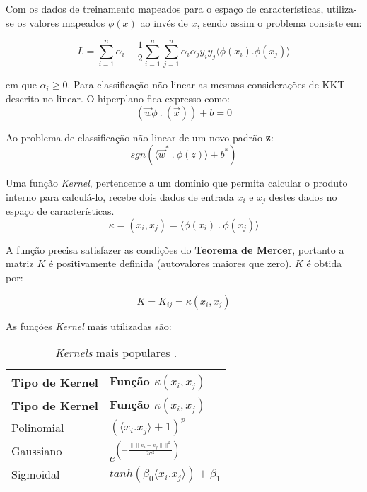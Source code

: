 \documentclass[
]{book}
\begin{document}
Com os dados de treinamento mapeados para o espaço de características, utiliza-se os valores mapeados \(\phi(x)\) ao invés de \(x\), sendo assim o problema consiste em:

\begin{equation} 
L =\displaystyle \sum^n_{i=1}\alpha_i-\frac{1}{2} \displaystyle \sum^n_{i=1}\sum^n_{j=1}\alpha_i\alpha_j y_i y_j \langle \phi(x_i).\phi(x_j)\rangle
\label{eq:svnphi}
\end{equation}

em que \(\alpha_i \geq 0\). Para classificação não-linear as mesmas considerações de KKT descrito no linear. O hiperplano fica expresso como:
\begin{equation}
(\vec{w}\phi \ . \ (\vec{x}))+b=0
\label{eq:hipotimophi}
\end{equation}

Ao problema de classificação não-linear de um novo padrão \textbf{z}:
\begin{equation}
sgn(\langle \vec{w}^* \ . \ \phi(z)\rangle+b^*)
\label{eq:naolinzphi}
\end{equation}

Uma função \emph{Kernel}, pertencente a um domínio que permita calcular o produto interno para calculá-lo, recebe dois dados de entrada \(x_i\) e \(x_j\) destes dados no espaço de características.
\begin{equation}
\kappa=(x_i,x_j)=\langle \phi(x_i) \ . \ \phi(x_j)\rangle
\label{eq:kernel}
\end{equation}

A função precisa satisfazer as condições do \textbf{Teorema de Mercer}, portanto a matriz \(K\) é positivamente definida (autovalores maiores que zero). \(K\) é obtida por:

\begin{equation}
K=K_{ij}=\kappa(x_i,x_j)
\label{eq:mercer}
\end{equation}

As funções \emph{Kernel} mais utilizadas são:

\begin{longtable}[]{@{}ll@{}}
\caption{\label{tab:kernel} \emph{Kernels} mais populares \citep{gonccalves2015maquina}.}\tabularnewline
\toprule
\textbf{Tipo de Kernel} & \textbf{Função \(\kappa(x_i,x_j)\)}\tabularnewline
\midrule
\endfirsthead
\toprule
\textbf{Tipo de Kernel} & \textbf{Função \(\kappa(x_i,x_j)\)}\tabularnewline
\midrule
\endhead
Polinomial & \((\langle x_i.x_j\rangle +1)^p\)\tabularnewline
Gaussiano & \(e^{(-\frac{\|\|x_i-x_j\|\|^2}{2\sigma^2})}\)\tabularnewline
Sigmoidal & \(tanh(\beta_0 \langle x_i.x_j\rangle )+\beta_1\)\tabularnewline
\bottomrule
\end{longtable}
\end{document}
